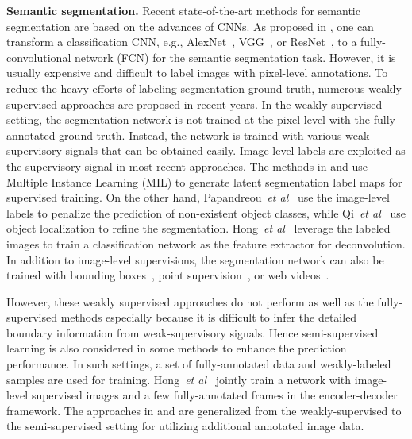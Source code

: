 \documentclass{bmvc2k}
\def\etal{\emph{et al}\bmvaOneDot}
\begin{document}
	
	{\flushleft \bf Semantic segmentation.}
	Recent state-of-the-art methods for semantic segmentation are based on the advances of CNNs. As proposed in \cite{fcn}, one can transform a classification CNN, e.g., AlexNet~\cite{alexnet}, VGG~\cite{vgg}, or ResNet~\cite{resnet}, to a fully-convolutional network (FCN) for the semantic segmentation task. 
	However, it is usually expensive and difficult to label images with pixel-level annotations. 
	To reduce the heavy efforts of labeling segmentation ground truth, numerous weakly-supervised approaches are proposed in recent years.
	In the weakly-supervised setting, the segmentation network is not trained at the pixel level with the fully annotated ground truth. Instead, the network is trained with various weak-supervisory signals that can be obtained easily.
	Image-level labels are exploited as the supervisory signal in most recent approaches.
	The methods in \cite{pinheiro2015weakly} and \cite{pathak2014fully} use Multiple Instance Learning (MIL) to generate latent segmentation label maps for supervised training.
	On the other hand, Papandreou~\etal~\cite{papandreou2015weakly} use the image-level labels to penalize the prediction of non-existent object classes, while Qi~\etal~\cite{qi2016augmented} use object localization to refine the segmentation. 
	Hong~\etal~\cite{hong2015decoupled} leverage the labeled images to train a classification network as the feature extractor for deconvolution.
	In addition to image-level supervisions, the segmentation network can also be trained with bounding boxes~\cite{dai2015boxsup, khoreva_CVPR17}, point supervision~\cite{bearman2016s}, or web videos~\cite{hong2017weakly}.
	
	
	However, these weakly supervised approaches do not perform as well as the fully-supervised methods especially because it is difficult to infer the detailed boundary information 
	from weak-supervisory signals.
	Hence semi-supervised learning is also considered in some methods to enhance the prediction performance.
	In such settings, a set of fully-annotated data and weakly-labeled samples 
	are used for training.
	Hong~\etal~\cite{hong2015decoupled} jointly train a network with image-level supervised images and  a few fully-annotated frames in the encoder-decoder framework. 
	The approaches in \cite{dai2015boxsup} and \cite{papandreou2015weakly} are generalized from the weakly-supervised to the semi-supervised setting for utilizing additional annotated image data.
	
\end{document}
